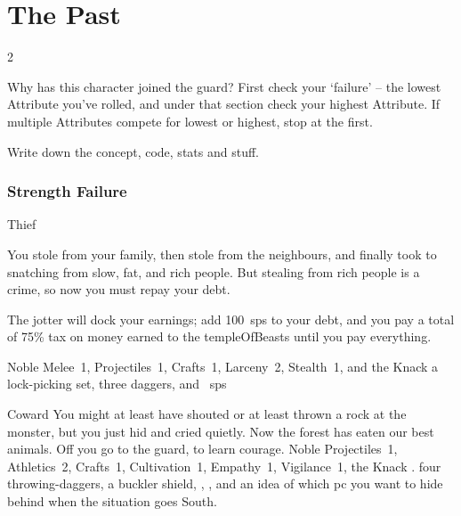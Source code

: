 \section{The Past}
\label{enlistment}
\pagestyle{plain}

\begin{multicols}{2}

\noindent
Why has this character joined the \gls{guard}?
First check your `failure' -- the lowest Attribute you've rolled, and under that section check your highest Attribute.
If multiple Attributes compete for lowest or highest, stop at the first.

Write down the concept, code, stats and stuff.

\subsubsection{Strength Failure}

\begin{itemize}

    {Thief}%
    {
      You stole from your family, then stole from the neighbours, and finally took to snatching from slow, fat, and rich people.
      But stealing from rich people is a crime, so now you must repay your debt.

      The \gls{jotter} will dock your earnings; add 100~\glspl{sp} to your debt, and you pay a total of 75\% tax on money earned to the \gls{templeOfBeasts} until you pay everything.

    }%
    {Noble}%
    {Melee~1, Projectiles~1, Crafts~1, Larceny~2, Stealth~1, and the Knack }%
    {a lock-picking set, three daggers, and ~\glspl{sp}}%

    {Coward}%
    {
      You might at least have shouted or at least thrown a rock at the \gls{monster}, but you just hid and cried quietly.
      Now the forest has eaten our best animals.
      Off you go to the \gls{guard}, to learn courage.
    }%
    {Noble}%
    {
      Projectiles~1, Athletics~2, Crafts~1, Cultivation~1, Empathy~1, Vigilance~1, the Knack
      \laststand.
    }%
    {
      four throwing-daggers, a buckler shield, \rations, \rations, and an idea of which \gls{pc} you want to hide behind when the situation goes South.
    }%



\end{itemize}
\end{multicols}
